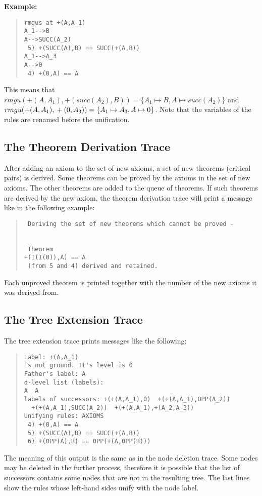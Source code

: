 \noindent
{\bf Example:}
\begin{quote}   
\begin{verbatim}
rmgus at +(A,A_1)
A_1-->B
A-->SUCC(A_2)
 5) +(SUCC(A),B) == SUCC(+(A,B))
A_1-->A_3
A-->0
 4) +(0,A) == A
\end{verbatim}
\end{quote}   
This means that $rmgu(+(A,A_1),+(succ(A_2),B))=\{A_1 \mapsto B, A \mapsto
succ(A_2)\}$ and $rmgu(+(A,A_1),\\+(0,A_3))=\{A_1 \mapsto A_3, A \mapsto
0\}$. Note that the variables of the rules are renamed before the
unification.


\subsection{The Theorem Derivation Trace}
After adding an axiom to the set of new axioms, a set of new theorems
(critical pairs)
is derived. Some theorems can be proved by the axioms in the set of new
axioms. The other theorems are added to the queue of theorems. If such
theorems are derived by the new axiom, the theorem derivation trace will
print a message like in the following example:
\begin{quote}
\begin{verbatim}
 Deriving the set of new theorems which cannot be proved -
    
 
 Theorem
+(I(I(0)),A) == A
 (from 5 and 4) derived and retained.
\end{verbatim}
\end{quote}
Each unproved theorem is printed together with the number of the new 
axioms it was derived from.

\subsection{The Tree Extension Trace}
The tree extension trace prints messages like the following:
\begin{quote}
\begin{verbatim}
Label: +(A,A_1)
is not ground. It's level is 0
Father's label: A
d-level list (labels): 
A  A  
labels of successors: +(+(A,A_1),0)  +(+(A,A_1),OPP(A_2))  
  +(+(A,A_1),SUCC(A_2))  +(+(A,A_1),+(A_2,A_3))  
Unifying rules: AXIOMS
 4) +(0,A) == A
 5) +(SUCC(A),B) == SUCC(+(A,B))
 6) +(OPP(A),B) == OPP(+(A,OPP(B)))
\end{verbatim}
\end{quote}
The meaning of this output is the same as in the node deletion trace.
Some nodes may be deleted in the
further process, therefore it is possible that the list of successors
contains some nodes that are not in the resulting tree.
The last lines show the rules whose left-hand sides unify with the node
label.


